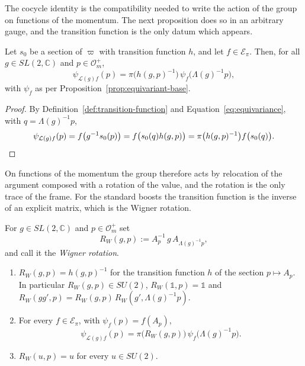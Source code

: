 The cocycle identity is the compatibility needed to write the action of the group on functions of the momentum. The next proposition does so in an arbitrary gauge, and the transition function is the only datum which appears.

\begin{proposition}\label{prop:action-trivialization}
	Let $s_0$ be a section of $\varpi$ with transition function $h$, and let $f\in\mathcal{E}_\pi$. Then, for all $g\in SL(2,\mathbb{C})$ and $p\in\mathcal{O}_m^+$,
	\begin{equation*}
		\psi_{\mathcal{L}(g)f}(p)=\pi\big(h(g,p)^{-1}\big)\,\psi_f\big(\Lambda(g)^{-1}p\big),
	\end{equation*}
	with $\psi_f$ as per Proposition~\ref{prop:equivariant-base}.
\end{proposition}

\begin{proof}
	By Definition~\ref{def:transition-function} and Equation~\eqref{eq:equivariance}, with $q=\Lambda(g)^{-1}p$,
	\begin{equation*}
		\psi_{\mathcal{L}(g)f}(p)=f\big(g^{-1}s_0(p)\big)=f\big(s_0(q)h(g,p)\big)=\pi\big(h(g,p)^{-1}\big)f\big(s_0(q)\big).\qedhere
	\end{equation*}
\end{proof}

On functions of the momentum the group therefore acts by relocation of the argument composed with a rotation of the value, and the rotation is the only trace of the frame. For the standard boosts the transition function is the inverse of an explicit matrix, which is the Wigner rotation.

\begin{proposition}\label{prop:induced-action}
	For $g\in SL(2,\mathbb{C})$ and $p\in\mathcal{O}_m^+$ set
	\begin{equation}\label{eq:wigner-rotation}
		R_W(g,p):=A_p^{-1}\,g\,A_{\Lambda(g)^{-1}p},
	\end{equation}
	and call it the \emph{Wigner rotation}.
	\begin{enumerate}
		\item $R_W(g,p)=h(g,p)^{-1}$ for the transition function $h$ of the section $p\mapsto A_p$. In particular $R_W(g,p)\in SU(2)$, $R_W(\mathbb{1},p)=\mathbb{1}$ and $R_W(gg',p)=R_W(g,p)\,R_W(g',\Lambda(g)^{-1}p)$.
		\item For every $f\in\mathcal{E}_\pi$, with $\psi_f(p)=f(A_p)$,
		\begin{equation}\label{eq:induced-action}
			\psi_{\mathcal{L}(g)f}(p)=\pi\big(R_W(g,p)\big)\,\psi_f\big(\Lambda(g)^{-1}p\big).
		\end{equation}
		\item $R_W(u,p)=u$ for every $u\in SU(2)$.
	\end{enumerate}
\end{proposition}

